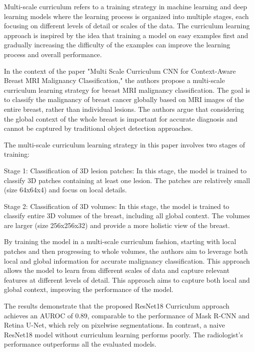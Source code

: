 \documentclass{article}
\begin{document}
Multi-scale curriculum refers to a training strategy in machine learning and deep learning models where the learning process is organized into multiple stages, each focusing on different levels of detail or scales of the data. The curriculum learning approach is inspired by the idea that training a model on easy examples first and gradually increasing the difficulty of the examples can improve the learning process and overall performance.

In the context of the paper "Multi Scale Curriculum CNN for Context-Aware Breast MRI Malignancy Classification," the authors propose a multi-scale curriculum learning strategy for breast MRI malignancy classification. The goal is to classify the malignancy of breast cancer globally based on MRI images of the entire breast, rather than individual lesions. The authors argue that considering the global context of the whole breast is important for accurate diagnosis and cannot be captured by traditional object detection approaches.

The multi-scale curriculum learning strategy in this paper involves two stages of training:

Stage 1: Classification of 3D lesion patches: In this stage, the model is trained to classify 3D patches containing at least one lesion. The patches are relatively small (size 64x64x4) and focus on local details.

Stage 2: Classification of 3D volumes: In this stage, the model is trained to classify entire 3D volumes of the breast, including all global context. The volumes are larger (size 256x256x32) and provide a more holistic view of the breast.

By training the model in a multi-scale curriculum fashion, starting with local patches and then progressing to whole volumes, the authors aim to leverage both local and global information for accurate malignancy classification. This approach allows the model to learn from different scales of data and capture relevant features at different levels of detail.
This approach aims to capture both local and global context, improving the performance of the model.

The results demonstrate that the proposed ResNet18 Curriculum approach achieves an AUROC of 0.89, comparable to the performance of Mask R-CNN and Retina U-Net, which rely on pixelwise segmentations. In contrast, a naive ResNet18 model without curriculum learning performs poorly. The radiologist's performance outperforms all the evaluated models.
\end{document}
